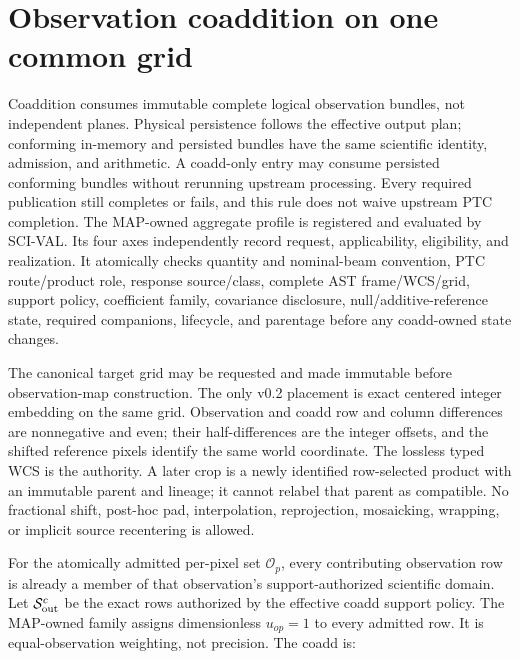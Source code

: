 \documentclass[10pt]{article}
\begin{document}
\clearpage
\section{Observation coaddition on one common grid}

Coaddition consumes immutable complete logical observation bundles, not
independent planes. Physical persistence follows the effective output plan;
conforming in-memory and persisted bundles have the same scientific identity,
admission, and arithmetic. A coadd-only entry may consume persisted conforming
bundles without rerunning upstream processing. Every required publication
still completes or fails, and this rule does not waive upstream PTC completion.
The MAP-owned aggregate profile
\SCIMapCoaddProfile{} is registered and evaluated by
SCI-VAL. Its four axes independently record request, applicability,
eligibility, and realization. It atomically checks quantity
and nominal-beam convention, PTC route/product role, response source/class,
complete AST frame/WCS/grid, support policy, coefficient family, covariance
disclosure, null/additive-reference state, required companions, lifecycle,
and parentage before any coadd-owned state changes.

The canonical target grid may be requested and made immutable before
observation-map construction. The only v0.2 placement is exact centered
integer embedding on the same grid.
Observation and coadd row and column differences are nonnegative and even;
their half-differences are the integer offsets, and the shifted reference
pixels identify the same world coordinate. The lossless typed WCS is the
authority. A later crop is a newly identified row-selected product with an
immutable parent and lineage; it cannot relabel that parent as compatible. No
fractional shift, post-hoc pad, interpolation, reprojection, mosaicking,
wrapping, or implicit source recentering is allowed.

For the atomically admitted per-pixel set \(\mathcal O_p\), every contributing
observation row is already a member of that observation's support-authorized
scientific domain. Let \(\mathcal S^c_{\rm out}\) be the exact rows authorized
by the effective coadd support policy. The MAP-owned family
\SCIMapUniformCoaddProfile{} assigns dimensionless
\(u_{op}=1\) to every admitted row. It is equal-observation weighting, not
precision. The coadd is:

\SCIMapCoaddEquations
\end{document}
